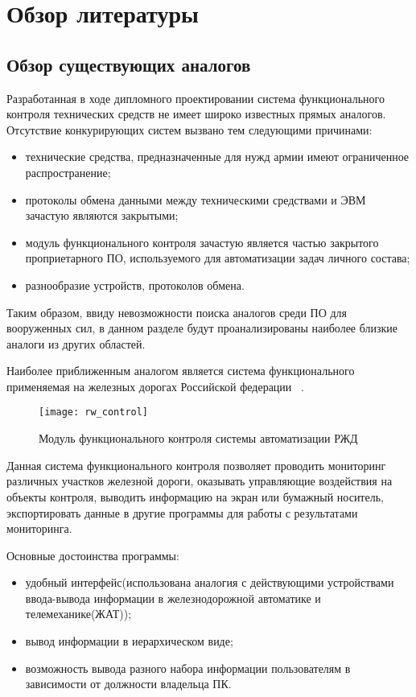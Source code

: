 \section{Обзор литературы}
\label{sec:lit_review}

\subsection{Обзор существующих аналогов}
\label{sub:lit_review:analogues}
Разработанная в ходе дипломного проектировании система функционального контроля технических средств не имеет широко
известных прямых аналогов. Отсутствие конкурирующих систем вызвано тем следующими причинами:
\begin{itemize}
	\item технические средства, предназначенные для нужд армии имеют ограниченное распространение;
	\item протоколы обмена данными между техническими средствами и ЭВМ зачастую являются закрытыми;
	\item модуль функционального контроля зачастую является частью закрытого проприетарного ПО, используемого для
		автоматизации задач личного состава;
	\item разнообразие устройств, протоколов обмена.
\end{itemize}

Таким образом, ввиду невозможности поиска аналогов среди ПО для вооруженных сил, в данном разделе будут проанализированы
наиболее близкие аналоги из других областей.

Наиболее приближенным аналогом является система функционального применяемая на железных дорогах Российской федерации
~\cite{rus_rails}.

\begin{figure}[ht]
	\centering
	\texttt{[image: rw\_control]}
	\caption{Модуль функционального контроля системы автоматизации РЖД~\cite{rus_rails}}
	\label{fig:lit_reiview:analogues:rw_control}
\end{figure}

Данная система функционального контроля позволяет проводить мониторинг различных участков железной дороги, оказывать
управляющие воздействия на объекты контроля, выводить информацию на экран или бумажный носитель, экспортировать данные в
другие программы для работы с результатами мониторинга.

Основные достоинства программы:
\begin{itemize}
	\item удобный интерфейс(использована аналогия с действующими устройствами ввода-вывода информации в
		железнодорожной автоматике и телемеханике(ЖАТ));
	\item вывод информации в иерархическом виде;
	\item возможность вывода разного набора информации пользователям в зависимости от должности владельца ПК.
\end{itemize}

